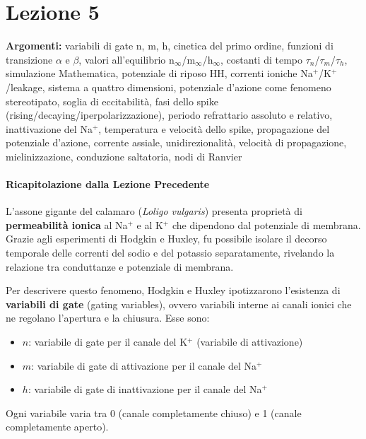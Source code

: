 \chapter{Lezione 5}


\textbf{Argomenti:} variabili di gate n, m, h, cinetica del primo ordine, funzioni di transizione $\alpha$ e $\beta$, valori all'equilibrio n$_\infty$/m$_\infty$/h$_\infty$, costanti di tempo $\tau_n$/$\tau_m$/$\tau_h$, simulazione Mathematica, potenziale di riposo HH, correnti ioniche Na$^+$/K$^+$/leakage, sistema a quattro dimensioni, potenziale d'azione come fenomeno stereotipato, soglia di eccitabilità, fasi dello spike (rising/decaying/iperpolarizzazione), periodo refrattario assoluto e relativo, inattivazione del Na$^+$, temperatura e velocità dello spike, propagazione del potenziale d'azione, corrente assiale, unidirezionalità, velocità di propagazione, mielinizzazione, conduzione saltatoria, nodi di Ranvier


\subsubsection{Ricapitolazione dalla Lezione Precedente}

L'assone gigante del calamaro (\textit{Loligo vulgaris}) presenta proprietà di \textbf{permeabilità ionica} al Na$^+$ e al K$^+$ che dipendono dal potenziale di membrana. Grazie agli esperimenti di Hodgkin e Huxley, fu possibile isolare il decorso temporale delle correnti del sodio e del potassio separatamente, rivelando la relazione tra conduttanze e potenziale di membrana.

Per descrivere questo fenomeno, Hodgkin e Huxley ipotizzarono l'esistenza di \textbf{variabili di gate} (gating variables), ovvero variabili interne ai canali ionici che ne regolano l'apertura e la chiusura. Esse sono:

\begin{itemize}
    \item \textbf{$n$}: variabile di gate per il canale del K$^+$ (variabile di attivazione)
    \item \textbf{$m$}: variabile di gate di attivazione per il canale del Na$^+$
    \item \textbf{$h$}: variabile di gate di inattivazione per il canale del Na$^+$
\end{itemize}

Ogni variabile varia tra 0 (canale completamente chiuso) e 1 (canale completamente aperto).




